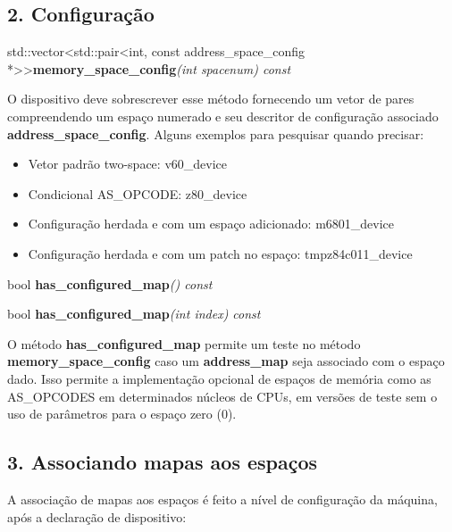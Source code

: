 \documentclass[letterpaper,10pt,brazil]{sphinxmanual}
\begin{document}
\subsection{2. Configuração}
\label{techspecs/device_memory_interface:configuracao}
\begin{DUlineblock}{0em}
\item[] std::vector\textless{}std::pair\textless{}int, const address\_space\_config *\textgreater{}\textgreater{}\textbf{memory\_space\_config}\emph{(int spacenum) const}
\end{DUlineblock}

O dispositivo deve sobrescrever esse método fornecendo um vetor de pares
compreendendo um espaço numerado e seu descritor de configuração
associado \textbf{address\_space\_config}. Alguns exemplos para pesquisar
quando precisar:
\begin{itemize}
\item {} 
Vetor padrão two-space: v60\_device

\item {} 
Condicional AS\_OPCODE: z80\_device

\item {} 
Configuração herdada e com um espaço adicionado: m6801\_device

\item {} 
Configuração herdada e com um patch no espaço: tmpz84c011\_device

\end{itemize}

\begin{DUlineblock}{0em}
\item[] bool \textbf{has\_configured\_map}\emph{() const}
\item[] bool \textbf{has\_configured\_map}\emph{(int index) const}
\end{DUlineblock}

O método \textbf{has\_configured\_map} permite um teste no método
\textbf{memory\_space\_config} caso um \textbf{address\_map} seja associado com o
espaço dado. Isso permite a implementação opcional de espaços de memória
como as AS\_OPCODES em determinados núcleos de CPUs, em versões de teste
sem o uso de parâmetros para o espaço zero (0).


\subsection{3. Associando mapas aos espaços}
\label{techspecs/device_memory_interface:associando-mapas-aos-espacos}
A associação de mapas aos espaços é feito a nível de configuração da
máquina, após a declaração de dispositivo:
\end{document}
